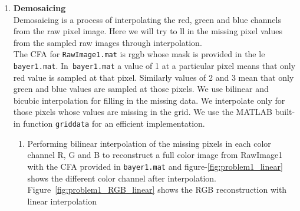 \documentclass[11pt, a4]{article}
\begin{document}
\begin{enumerate}
		\item \textbf{Demosaicing}\\
		Demosaicing is a process of interpolating the red, green and blue channels from
		the raw pixel image. Here we will try to ll in the missing pixel values from
		the sampled raw images through interpolation. \\
		 The CFA for \texttt{RawImage1.mat} is rggb whose mask is provided in the le
		\texttt{bayer1.mat}. In\texttt{ bayer1.mat} a value of 1 at a particular pixel means that only
		red value is sampled at that pixel. Similarly values of 2 and 3 mean that
		only green and blue values are sampled at those pixels. We use bilinear and
		bicubic interpolation for filling in the missing data. We interpolate only for
		those pixels whose values are missing in the grid. We use the MATLAB built-in
		function \texttt{griddata} for an efficient implementation.
		\begin{enumerate}
			\item Performing bilinear interpolation of the missing pixels in each color channel	R, G and B to reconstruct a full color image from RawImage1 with the CFA provided in \texttt{bayer1.mat} and figure-\ref{fig:problem1_linear} shows the different color channel after interpolation. Figure~\ref{fig:problem1_RGB_linear} shows the RGB reconstruction with linear interpolation
			\begin{figure}[H]
				\centering
\end{figure}
\end{enumerate}
\end{enumerate}
\end{document}
